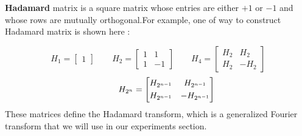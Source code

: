 	\textbf{Hadamard} matrix is a square matrix whose entries are either $+1$ or $-1$ and whose rows are mutually orthogonal.For example, one of way to construct Hadamard matrix is shown here :
	
	$$
	H_{1} = \begin{bmatrix}
	1
	\end{bmatrix}
	\qquad
	H_{2} = \begin{bmatrix}
	1 & 1           \\[0.3em]
	1& -1
	\end{bmatrix}	
	\qquad
	H_{4} = \begin{bmatrix}
	H_{2} & H_{2}           \\[0.3em]
	H_{2}& -H_{2}
	\end{bmatrix}	
	$$
	$$
	\centering
	\qquad
	H_{2^{n}} = \begin{bmatrix}
	H_{2^{n-1}} & H_{2^{n-1}}           \\[0.3em]
	H_{2^{n-1}}& -H_{2^{n-1}}            
	\end{bmatrix}	
	$$
These matrices define the Hadamard transform, which is a generalized Fourier transform 
that we will use in our experiments section. 
